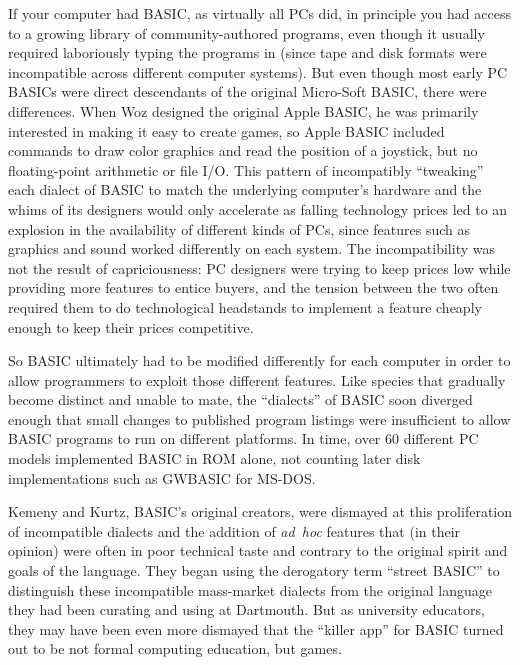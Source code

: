 If your computer had BASIC, as virtually all PCs did, in principle you had access
to a growing library of community-authored programs, even though it
usually required laboriously typing the programs in (since tape and
disk formats were incompatible across different computer systems).
But even though most early PC BASICs were direct descendants of the
original Micro-Soft BASIC, there were differences.
When Woz designed the original Apple BASIC, he was primarily interested in making it easy to create games,
so Apple BASIC included
commands to draw color graphics and read the position of a joystick,
but no floating-point arithmetic or file I/O.  This
pattern of incompatibly ``tweaking'' each dialect of BASIC to match
the underlying computer's hardware and the whims of its designers
would only accelerate as falling technology prices led to an explosion
in the availability of different kinds of PCs, 
since features such as graphics and sound worked differently on each
system.
The incompatibility was not the result of capriciousness: PC designers
were trying to keep prices low while providing more features to entice
buyers, and the tension between the two often required them to do
technological headstands to implement a feature cheaply enough to keep
their prices competitive.

So BASIC ultimately had to be modified differently for each computer
in order to allow programmers to exploit those different features.
Like species that gradually become distinct and unable to mate, the ``dialects'' of BASIC
soon diverged enough that small changes to
published program listings were insufficient to allow BASIC
programs to run on different platforms.
In time, over 60 different PC models implemented BASIC in ROM alone,
not counting later disk implementations such as GWBASIC for MS-DOS.

Kemeny and Kurtz, BASIC's original creators, were dismayed at this
proliferation of incompatible dialects and the addition of
\emph{ad~hoc} features that (in their opinion) were often in poor
technical taste and contrary to the original spirit and goals of the
language.
They began using the derogatory term ``street BASIC'' to distinguish
these incompatible mass-market dialects from the original language
they had been curating and using at Dartmouth.
But as university educators, they may have been even more dismayed
that the ``killer app'' for BASIC turned out to be not formal
computing education, but games.


